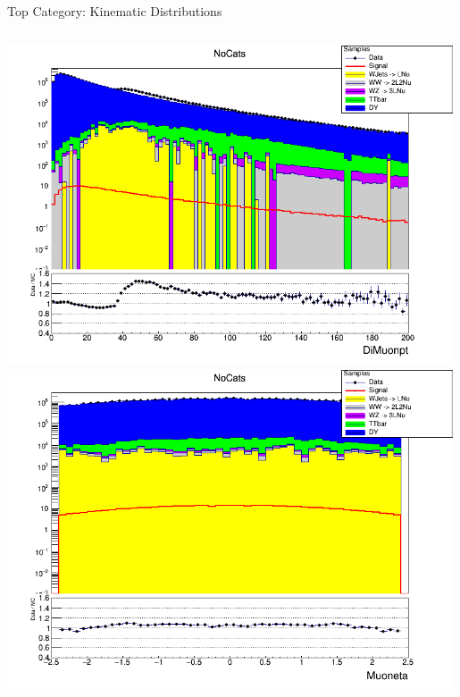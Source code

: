 \documentclass[pdf, 9pt]{beamer}
\begin{document}
\begin{frame}{Top Category: Kinematic Distributions}
\begin{columns}[T]
\begin{column}{0.5\textwidth}
        \includegraphics[width=0.99\textwidth, height=0.45\textheight]{figs/higgs/distributions/baseline_rochester/distribution__NoCats__DiMuonpt__logY.png}\\
        \includegraphics[width=0.99\textwidth, height=0.45\textheight]{figs/higgs/distributions/baseline_rochester/distribution__NoCats__Muoneta__logY.png}
      \end{column}
    \end{columns}
  \end{frame}
\end{document}
